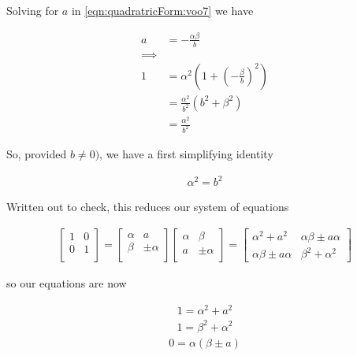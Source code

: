 Solving for $a$ in \ref{eqn:quadratricForm:voo7} we have

\begin{align*}
a &= -\frac{\alpha \beta}{b} \\
\implies \\
1 
&= \alpha^2 \left( 1 + \left(-\frac{\beta}{b} \right)^2 \right) \\
&= \frac{\alpha^2}{b^2} \left( b^2 + \beta^2 \right) \\
&= \frac{\alpha^2}{b^2} 
\end{align*}

So, provided $b \ne 0)$, we have a first simplifying identity

\begin{align}\label{eqn:quadratricForm:voo8}
\alpha^2 = b^2
\end{align}

Written out to check, this reduces our system of equations

\begin{align}\label{eqn:quadratricForm:voo9}
\begin{bmatrix}
1 & 0 \\
0 & 1 \\
\end{bmatrix}
=
\begin{bmatrix}
\alpha & a     \\
\beta  & \pm \alpha \\
\end{bmatrix}
\begin{bmatrix}
\alpha & \beta \\
a      & \pm \alpha \\
\end{bmatrix}
= 
\begin{bmatrix}
\alpha^2 + a^2 & \alpha \beta \pm a \alpha \\
\alpha \beta \pm a \alpha & \beta^2 + \alpha^2
\end{bmatrix}
\end{align}

so our equations are now

\begin{align}\label{eqn:quadratricForm:voo10}
1 = \alpha^2 + a^2 
\end{align}
\begin{align}\label{eqn:quadratricForm:voo11}
1 = \beta^2 + \alpha^2
\end{align}
\begin{align}\label{eqn:quadratricForm:voo12}
0 = \alpha (\beta \pm a )
\end{align}

